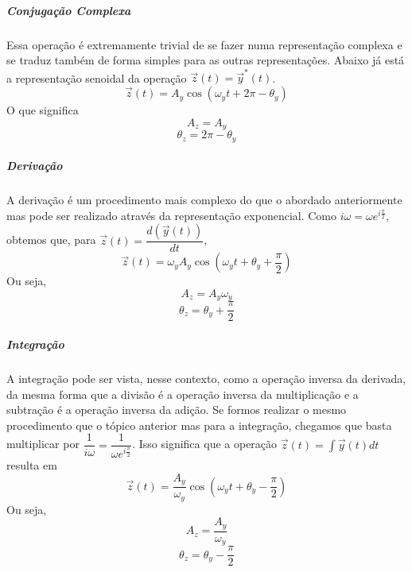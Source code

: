 \documentclass[conference,harvard, brazil]{sbatex}
\begin{document}
	\subparagraph{Conjugação Complexa}Essa operação é extremamente trivial de se fazer numa representação complexa e se traduz também de forma simples para as outras representações. Abaixo já está a representação senoidal da operação $\overrightarrow{z}(t)=\overrightarrow{y}^{*}(t)$.
	\begin{equation*}
		\overrightarrow{z}(t) = A_y\cos(\omega_yt+2\pi-\theta_y)
	\end{equation*}
	O que significa
	\begin{equation*}
		A_z=A_y
	\end{equation*}
	\begin{equation}
		\theta_z=2\pi-\theta_y
		\label{eq:conj}
	\end{equation}
	
	\subparagraph{Derivação}A derivação é um procedimento mais complexo do que o abordado anteriormente mas pode ser realizado através da representação exponencial. Como $i\omega=\omega e^{i\tfrac{\pi}{2}}$, obtemos que, para $\overrightarrow{z}(t)=\dfrac{d(\overrightarrow{y}(t))}{dt}$,
	\begin{equation*}
		\overrightarrow{z}(t) = \omega_yA_y\cos\left(\omega_yt+\theta_y+\dfrac{\pi}{2}\right)
	\end{equation*}
	Ou seja,
	\begin{equation*}
		A_z=A_y\omega_y
	\end{equation*}
	\begin{equation}
		\theta_z=\theta_y+\dfrac{\pi}{2}
		\label{eq:der}
	\end{equation}
	
	\subparagraph{Integração}A integração pode ser vista, nesse contexto, como a operação inversa da derivada, da mesma forma que a divisão é a operação inversa da multiplicação e a subtração é a operação inversa da adição. Se formos realizar o mesmo procedimento que o tópico anterior mas para a integração, chegamos que basta multiplicar por $\dfrac{1}{i\omega}=\dfrac{1}{\omega e^{i\tfrac{\pi}{2}}}$. Isso significa que a operação $\overrightarrow{z}(t)=\int\overrightarrow{y}(t)dt$ resulta em
	\begin{equation*}
		\overrightarrow{z}(t) = \dfrac{A_y}{\omega_y}\cos\left(\omega_yt+\theta_y-\dfrac{\pi}{2}\right)
	\end{equation*}
	Ou seja,
	\begin{equation*}
		A_z=\dfrac{A_y}{\omega_y}
	\end{equation*}
	\begin{equation}
		\theta_z=\theta_y-\dfrac{\pi}{2}
		\label{eq:int}
	\end{equation}
	
\end{document}
